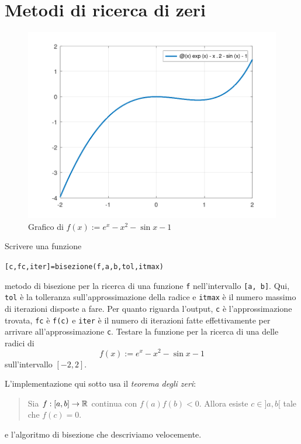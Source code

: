 
\section{Metodi di ricerca di zeri}

\begin{figure}
\centering
\includegraphics[width=.7\textwidth]{../zeri/graph1.png}
\caption{Grafico di \(f(x) := e^x - x^2 - \sin x - 1\)}
\end{figure}

\begin{esercizio}
Scrivere una funzione
\begin{center}
\lstinline£[c,fc,iter]=bisezione(f,a,b,tol,itmax)£
\end{center}
metodo di bisezione per la ricerca di una funzione \lstinline£f£ nell'intervallo \lstinline£[a, b]£. Qui, \lstinline£tol£ è la tolleranza sull'approssimazione della radice e \lstinline£itmax£ è il numero massimo di iterazioni disposte a fare. Per quanto riguarda l'output, \lstinline£c£ è l'approssimazione trovata, \lstinline£fc£ è \lstinline£f(c)£ e \lstinline£iter£ è il numero di iterazioni fatte effettivamente per arrivare all'approssimazione \lstinline£c£. Testare la funzione per la ricerca di una delle radici di
\[f(x) := e^x - x^2 - \sin x - 1\]
sull'intervallo \([-2, 2]\).
\end{esercizio}

L'implementazione qui sotto usa il {\em teorema degli zeri}:
\begin{quotation}
Sia \(f : [a, b] \to \mathbb R\) continua con \(f(a)f(b) < 0\). Allora esiste \(c \in ]a, b[\) tale che \(f(c) = 0\).
\end{quotation}

e l'algoritmo di bisezione che descriviamo velocemente.

